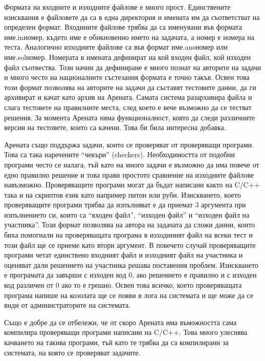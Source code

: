 \documentclass[a4paper,12pt]{article}
\begin{document}
    Формата на входните и изходните файлове е много прост. Единствените изисквания е файловете да са в една директория и имената им да съответстват на определен формат. Входините файлове трябва да са именувани във формата {име}.in{номер}, където {име} е обикновенно името на задачата, а {номер} е номера на теста. Аналогично изходните файлове са във формат {име}.ans{номер} или {име}.sol{номер}. Номерата в имената дефинират на кой входен файл, кой изходен файл съотвества. Този начин да дефиниране е много познат на авторите на задачи и много често на националните състезания формата е точно такъв. Освен това този формат позволява на авторите на задачи да съставят тестовите данни, да ги архивират и качат като архив на Арената. Самата система разархивира файла и слага тестовете на правилните места, след което е вече възможно да се тестват решения. За момента Арената няма функционалност, която да следи различните версии на тестовете, които са качени. Това би била интересна добавка.
    
    Арената също поддържа задачи, които се проверяват от проверяващи програми. Това са така наречените ``чекъри'' (checkers). Необходимостта от подобни програми често се налага, тъй като на много задачи е възможно да има повече от едно правилно решение и това прави простото сравнение на изходните файлове навъзможно. Проверяващите програми могат да бъдат написани както на C/C++ така и на скриптов език като например питон или руби. Изискването, което проверяващите програми трябва да изпълняват е да приемат 3 аргумента при изпълнението си, които са ``входен файл'', ``изходен файл'' и ``изходен файл на участника''. Този формат позволява на автора на задачата да сложи данни, които биха помогнали на проверяващата програма в изходиният файл на всеки тест и този файл ще се приеме като втори аргумент. В повечето случай проверяващите програми четат единствено входният файл и изходният файл на участника и оценяват дали решението на участника решава поставения проблем. Изискването е програмата да завърши с изходен код 0, ако решението е правилно и с изходен код различен от 0 ако то е грешно. Освен това всичко, което проверяващата програма напише на козолата ще се появи в лога на системата и ще може да се види от администраторите на системата.
    
    Също е добре да се отбележи, че от скоро Арената има въможността сама компилира проверяващи програми написани на C/C++. Това много улеснява качването на такива програми, тъй като те трябва да са компилирани за системата, на която се проверяват задачите.
\end{document}
